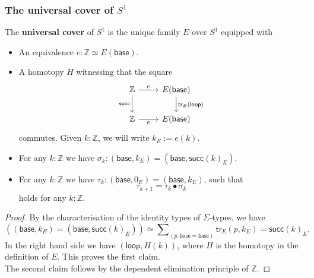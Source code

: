 \documentclass[handout]{beamer}
\newcommand{\Z}{\mathbb{Z}}
\newcommand{\sphere}[1]{S^{#1}}
\newcommand{\baseS}{\mathsf{base}}
\newcommand{\loopS}{\mathsf{loop}}
\newcommand{\tr}{\mathsf{tr}}
\newcommand{\succZ}{\mathsf{succ}}
\begin{document}
\begin{frame}
  \frametitle{The universal cover of $\sphere{1}$}
  
  \begin{definition}
    The \textbf{universal cover} of $\sphere{1}$ is the unique family $E$ over $\sphere{1}$ equipped with
    \begin{itemize}
    \item An equivalence $e:\Z\simeq E(\baseS)$.
    \item A homotopy $H$ witnessing that the square
      \begin{equation*}
        \begin{tikzcd}[ampersand replacement=\&]
          \Z \arrow[d,swap,"\succZ"] \arrow[r,"e"] \& E(\baseS) \arrow[d,"\tr_E(\loopS)"] \\
          \Z \arrow[r,swap,"e"] \& E(\baseS)
        \end{tikzcd}
      \end{equation*}
      commutes. Given $k:\Z$, we will write $k_E:=e(k)$. 
    \end{itemize}
  \end{definition}
\end{frame}

\begin{frame}
  \begin{lemma}[Helix]
    \begin{itemize}
    \item For any $k:\Z$ we have $\sigma_k:(\baseS,k_E)=(\baseS,\succZ(k)_E)$.
    \item For any $k:\Z$ we have $\tau_k:(\baseS,0_E)=(\baseS,k_E)$, such that 
      \begin{equation*}
        \tau_{k+1}=\tau_k\bullet \sigma_k
      \end{equation*}
      holds for any $k:\Z$.
    \end{itemize}
  \end{lemma}

  \begin{proof}
    By the characterisation of the identity types of $\Sigma$-types, we have
    \begin{equation*}
      ((\baseS,k_E)=(\baseS,\succZ(k)_E)) \simeq \sum\nolimits_{(p:\baseS=\baseS)}\tr_E(p,k_E)=\succZ(k)_E.
    \end{equation*}
    In the right hand side we have $(\loopS,H(k))$, where $H$ is the homotopy in the definition of $E$. This proves the first claim.\\[1em]

    The second claim follows by the dependent elimination principle of $\Z$.
  \end{proof}
\end{frame}
\end{document}
